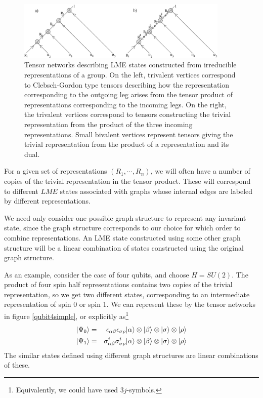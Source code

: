 \documentclass[12pt]{article}
\theoremstyle{definition}
\newcommand{\bea}{\begin{eqnarray}}
\newcommand{\eea}{\end{eqnarray}}
\begin{document}
\begin{figure} \label{fig:tensorBoth} 
\centering
\includegraphics[width=0.9\textwidth]{tensorBoth.eps}
\caption{Tensor networks describing LME states constructed from irreducible representations of a group. On the left, trivalent vertices correspond to Clebsch-Gordon type tensors describing how the representation corresponding to the outgoing leg arises from the tensor product of representations corresponding to the incoming legs. On the right, the trivalent vertices correspond to tensors constructing the trivial representation from the product of the three incoming representations. Small bivalent vertices represent tensors giving the trivial representation from the product of a representation and its dual.}
\label{tensorBoth}
\end{figure}

For a given set of representations $(R_1, \cdots, R_n)$, we will often have a number of copies of the trivial representation in the tensor product. These will correspond to different $LME$ states associated with graphs whose internal edges are labeled by different representations.

We need only consider one possible graph structure to represent any invariant state, since the graph structure corresponds to our choice for which order to combine representations. An LME state constructed using some other graph structure will be a linear combination of states constructed using the original graph structure.

As an example, consider the case of four qubits, and choose $H = SU(2)$. The product of four spin half representations contains two copies of the trivial representation, so we get two different states, corresponding to an intermediate representation of spin 0 or spin 1. We can represent these by the tensor networks in figure \ref{qubit4simple}, or explicitly as\footnote{Equivalently, we could have used $3j$-symbols.}
\bea
|\Psi_0 \rangle &=& \epsilon_{\alpha \beta} \epsilon_{\sigma \rho} | \alpha \rangle \otimes |\beta \rangle \otimes |\sigma \rangle \otimes |\rho \rangle \cr
|\Psi_1 \rangle &=& \sigma^i_{\alpha \beta} \sigma^i_{\sigma \rho} | \alpha \rangle \otimes |\beta \rangle \otimes |\sigma \rangle \otimes |\rho \rangle
\eea
The similar states defined using different graph structures are linear combinations of these.
\end{document}
